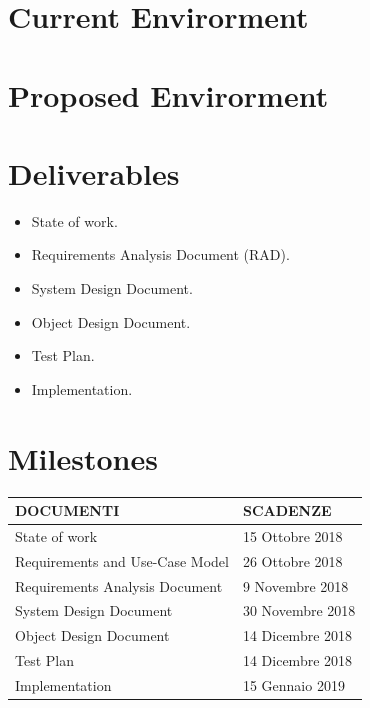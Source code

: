 	
	\section{Current Envirorment}
	
		
		
	\section{Proposed Envirorment}
	
		
	
	
	\section{Deliverables}
	
	\begin{itemize}
		
		\item State of work.
		
		\item Requirements Analysis Document (RAD).
		
		\item System Design Document.
		
		\item Object Design Document.
		
		\item Test Plan.
		
		\item Implementation.
		
		
	\end{itemize}
	
	
	\section{Milestones}
	
	
	\begin{tabularx}{0.9\textwidth}{|X|X|}	
		\hline
		DOCUMENTI & SCADENZE \\
		\hline
		State of work & 15 Ottobre 2018\\
		\hline
		Requirements and Use-Case Model & 26 Ottobre 2018\\
		\hline
		Requirements Analysis Document & 9 Novembre 2018\\
		\hline
		System Design Document & 30 Novembre 2018\\
		\hline
		Object Design Document & 14 Dicembre 2018\\
		\hline
		Test Plan & 14 Dicembre 2018\\
		\hline
		Implementation & 15 Gennaio 2019\\
		\hline
	\end{tabularx}
	
